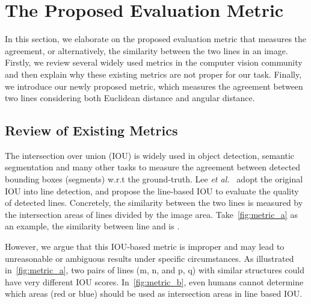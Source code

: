 \documentclass[10pt,journal,cspaper,compsoc]{IEEEtran}
\newcommand{\revise}[1]{{\textcolor{black}{#1}}}
\newcommand{\CheckRmv}[1]{}
\newcommand{\CheckRmv}[1]{#1}
\def\etal{\emph{et al.~}}
\begin{document}
\CheckRmv{
\begin{figure*}[t!]
  \centering
  \begin{overpic}[width=1.0\linewidth]{figures/sl_scores.pdf}
    \put(6, -1.5){}
    \put(26.5, -1.5){}
    \put(46.5, -1.5){}
    \put(66.5, -1.5){}
    \put(86.5, -1.5){}
\end{overpic}
  \caption{
    Example lines with various EA-scores ( in ~\cref{eq:ea-score}).
    \revise{The larger the EA-score is, the more similar the lines are.}
  }\label{fig:metric_show}
\end{figure*}
}

\section{The Proposed Evaluation Metric} 
\label{sec:metric}

In this section, we elaborate on the 
proposed evaluation metric that measures the agreement, or alternatively, 
the similarity between the two lines in an image.
Firstly, we review several widely used metrics in the computer vision community 
and then explain why these existing metrics are not proper for our task.
Finally, we introduce our newly proposed metric, which measures the agreement between two lines considering
both Euclidean distance and angular distance.


\subsection{Review of Existing Metrics}
The intersection over union (IOU) is widely used in object detection, semantic segmentation
and many other tasks to measure the agreement between detected bounding boxes
(segments) w.r.t the ground-truth.
Lee \etal \cite{lee2017semantic} adopt the original IOU into line detection,
and propose the line-based IOU to evaluate the quality of detected lines.
Concretely, the similarity between the two lines is measured by the intersection areas
of lines divided by the image area.
Take~\cref{fig:metric_a} as an example, the similarity between line  and 
is .

However, we argue that this IOU-based metric is improper  and may lead to unreasonable
or ambiguous results under specific circumstances.
As illustrated in~\cref{fig:metric_a}, 
two pairs of lines (m, n, and p, q) with similar structures could have
very different IOU scores.
In~\cref{fig:metric_b}, even humans cannot determine which areas
({red} or {blue}) should be used as
intersection areas in line based IOU.
\end{document}
